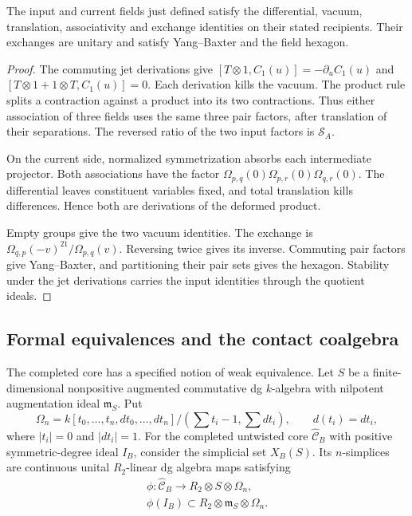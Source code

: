 \begin{proposition}
\label{v4-arith:md:prop:fields}
The input and current fields just defined satisfy the
differential, vacuum, translation, associativity and
exchange identities on their stated recipients.
Their exchanges are unitary and satisfy Yang--Baxter
and the field hexagon.
\end{proposition}

\begin{proof}
The commuting jet derivations give
$[T\otimes1,C_1(u)]=-\partial_uC_1(u)$ and
$[T\otimes1+1\otimes T,C_1(u)]=0$.
Each derivation kills the vacuum. The product rule
splits a contraction against a product into its two
contractions. Thus either association of three fields
uses the same three pair factors, after translation
of their separations. The reversed ratio of the two
input factors is $\mathcal S_A$.

On the current side, normalized symmetrization absorbs
each intermediate projector. Both associations have
the factor
$\Omega_{p,q}(0)\Omega_{p,r}(0)\Omega_{q,r}(0)$.
The differential leaves constituent variables fixed,
and total translation kills differences. Hence both
are derivations of the deformed product.

Empty groups
give the two vacuum identities. The exchange is
$\Omega_{q,p}(-v)^{21}/\Omega_{p,q}(v)$.
Reversing twice gives its inverse. Commuting pair
factors give Yang--Baxter, and partitioning their pair
sets gives the hexagon. Stability under the jet
derivations carries the input identities through
the quotient ideals.
\end{proof}

\subsection{Formal equivalences and the contact coalgebra}

The completed core has a specified notion of weak
equivalence. Let $S$ be a finite-dimensional nonpositive
augmented commutative dg $k$-algebra with nilpotent
augmentation ideal $\mathfrak m_S$. Put
\[
 \Omega_n=k[t_0,\ldots,t_n,dt_0,\ldots,dt_n]
 /(\textstyle\sum t_i-1,\sum dt_i),
 \qquad d(t_i)=dt_i,
\]
where $|t_i|=0$ and $|dt_i|=1$.
For the completed untwisted core $\widehat{\mathcal C}_B$
with positive symmetric-degree ideal $I_B$, consider
the simplicial set $X_B(S)$.
Its $n$-simplices are continuous unital
$R_2$-linear dg algebra maps satisfying
\begin{equation}\label{v4-arith:md:eq:formal-tests}
 \begin{gathered}
 \phi:\widehat{\mathcal C}_B\longrightarrow R_2\otimes S\otimes\Omega_n,\\
 \phi(I_B)\subset R_2\otimes\mathfrak m_S\otimes\Omega_n.
 \end{gathered}
\end{equation}

